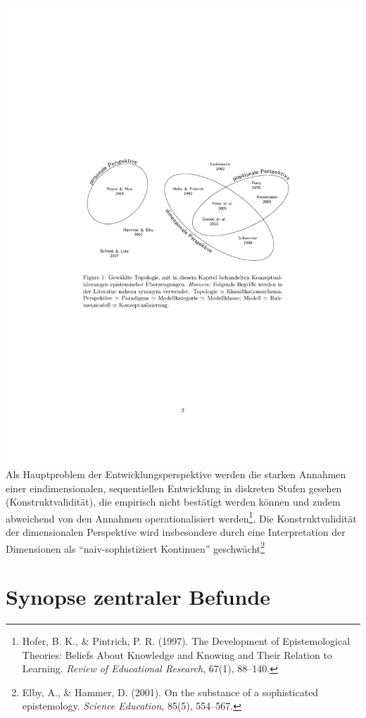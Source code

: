 \documentclass[]{tufte-handout}
\begin{document}
\includegraphics{../Img/Topologie.pdf} Als Hauptproblem der
Entwicklungsperspektive werden die starken Annahmen einer
eindimensionalen, sequentiellen Entwicklung in diskreten Stufen gesehen
(Konstruktvalidität), die empirisch nicht bestätigt werden können und
zudem abweichend von den Annahmen operationalisiert werden\footnote{Hofer,
  B. K., \& Pintrich, P. R. (1997). The Development of Epistemological
  Theories: Beliefs About Knowledge and Knowing and Their Relation to
  Learning. \emph{Review of Educational Research}, 67(1), 88--140.}. Die
Konstruktvalidität der dimensionalen Perspektive wird insbesondere durch
eine Interpretation der Dimensionen als ``naiv-sophistiziert Kontinuen''
geschwächt\footnote{Elby, A., \& Hammer, D. (2001). On the substance of
  a sophisticated epistemology. \emph{Science Education}, 85(5),
  554--567.}

\section{Synopse zentraler Befunde}\label{synopse-zentraler-befunde}
\end{document}
